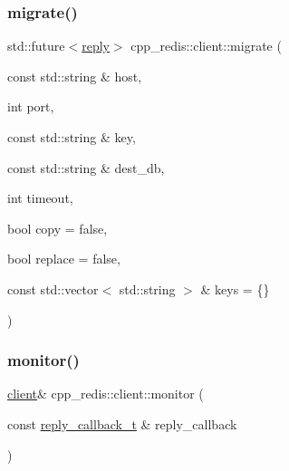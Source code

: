 \mbox{\label{classcpp__redis_1_1client_a1bbf11a4ebd3dcf12d9846946e5c3545}} 
\subsubsection{\texorpdfstring{migrate()}{migrate()}\hspace{0.1cm}{\footnotesize\ttfamily [3/3]}}
{\footnotesize\ttfamily std\+::future$<$\hyperlink{classcpp__redis_1_1reply}{reply}$>$ cpp\+\_\+redis\+::client\+::migrate (\begin{DoxyParamCaption}\item[{const std\+::string \&}]{host,  }\item[{int}]{port,  }\item[{const std\+::string \&}]{key,  }\item[{const std\+::string \&}]{dest\+\_\+db,  }\item[{int}]{timeout,  }\item[{bool}]{copy = {\ttfamily false},  }\item[{bool}]{replace = {\ttfamily false},  }\item[{const std\+::vector$<$ std\+::string $>$ \&}]{keys = {\ttfamily \{\}} }\end{DoxyParamCaption})}

\mbox{\label{classcpp__redis_1_1client_ad99627cb477d71f07fae0f88ed8ed85b}} 
\subsubsection{\texorpdfstring{monitor()}{monitor()}\hspace{0.1cm}{\footnotesize\ttfamily [1/2]}}
{\footnotesize\ttfamily \hyperlink{classcpp__redis_1_1client}{client}\& cpp\+\_\+redis\+::client\+::monitor (\begin{DoxyParamCaption}\item[{const \hyperlink{classcpp__redis_1_1client_a061a1140d36d2eaeda82b09a0bb3f9f2}{reply\+\_\+callback\+\_\+t} \&}]{reply\+\_\+callback }\end{DoxyParamCaption})}

